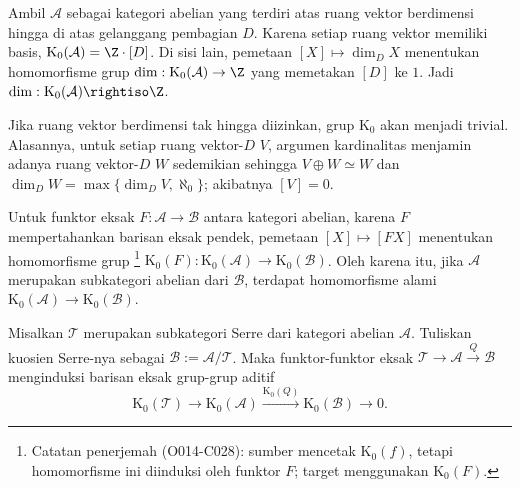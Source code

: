\begin{contoh}
Ambil $\mathcal{A}$ sebagai kategori abelian yang terdiri atas ruang vektor
berdimensi hingga
di atas gelanggang pembagian $D$. Karena setiap ruang vektor memiliki basis,
$\mathrm{K}_0(\mathcal{A})=\Z\cdot[D]$. Di sisi lain, pemetaan
$[X]\mapsto\dim_D X$ menentukan homomorfisme grup
$\dim:\mathrm{K}_0(\mathcal{A})\to\Z$ yang memetakan $[D]$ ke $1$.
Jadi $\dim:\mathrm{K}_0(\mathcal{A})\rightiso\Z$.

Jika ruang vektor berdimensi tak hingga diizinkan, grup $\mathrm{K}_0$ akan
menjadi trivial. Alasannya, untuk setiap ruang vektor-$D$ $V$, argumen
kardinalitas menjamin adanya ruang vektor-$D$ $W$ sedemikian sehingga
$V\oplus W\simeq W$ dan
$\dim_D W=\max\{\dim_D V,\aleph_0\}$; akibatnya $[V]=0$.
\end{contoh}

Untuk funktor eksak $F:\mathcal{A}\to\mathcal{B}$ antara kategori abelian,
karena $F$ mempertahankan barisan eksak pendek, pemetaan $[X]\mapsto[FX]$
menentukan homomorfisme grup
\footnote{Catatan penerjemah (O014-C028): sumber mencetak
$\mathrm{K}_0(f)$, tetapi homomorfisme ini diinduksi oleh funktor $F$;
target menggunakan $\mathrm{K}_0(F)$.}
$\mathrm{K}_0(F):\mathrm{K}_0(\mathcal{A})
\to\mathrm{K}_0(\mathcal{B})$.
Oleh karena itu, jika $\mathcal{A}$ merupakan subkategori abelian dari
$\mathcal{B}$, terdapat homomorfisme alami
$\mathrm{K}_0(\mathcal{A})\to\mathrm{K}_0(\mathcal{B})$.

\begin{proposisi}\label{prop:K0-exact-seq}
Misalkan $\mathcal{T}$ merupakan subkategori Serre dari kategori abelian
$\mathcal{A}$. Tuliskan kuosien Serre-nya sebagai
$\mathcal{B}:=\mathcal{A}/\mathcal{T}$. Maka funktor-funktor eksak
$\mathcal{T}\to\mathcal{A}\xrightarrow{Q}\mathcal{B}$ menginduksi
barisan eksak grup-grup aditif
\[\mathrm{K}_0(\mathcal{T})\to\mathrm{K}_0(\mathcal{A})
\xrightarrow{\mathrm{K}_0(Q)}\mathrm{K}_0(\mathcal{B})\to0.\]
\end{proposisi}

